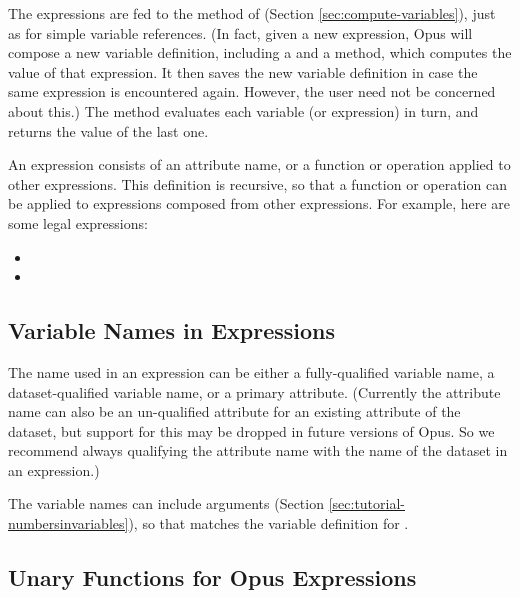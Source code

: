 The expressions are fed to the  method 
 of
 (Section \ref{sec:compute-variables}), just as for simple
variable references.  (In fact, given a new expression, Opus will compose a
new variable definition, including a  and a
 method, which computes the value of that expression.
It then saves the new variable definition in case the same expression is
encountered again.  However, the user need not
be concerned about this.)  The  method evaluates
each variable (or expression) in turn, and returns the value of the last one.

An expression consists of an attribute name, or a function or operation
applied to other expressions.  This definition is recursive, so that a
function or operation can be applied to expressions composed
from other expressions.  For example, here are some legal expressions:

\begin{itemize}

\item {}
\item {}

\end{itemize}

\subsection{Variable Names in Expressions}

The name used in an expression can be either a fully-qualified variable
name, a dataset-qualified variable name, or a primary attribute.
(Currently the attribute name can also be an un-qualified attribute for an
existing attribute of the dataset, but support for this may be dropped in
future versions of Opus.  So we recommend always qualifying the attribute
name with the name of the dataset in an expression.)

The variable names can include arguments (Section
\ref{sec:tutorial-numbersinvariables}), 
so that
 matches the variable definition
for .

\subsection{Unary Functions for Opus Expressions}
\label{sec:functions-for-opus-expressions}


